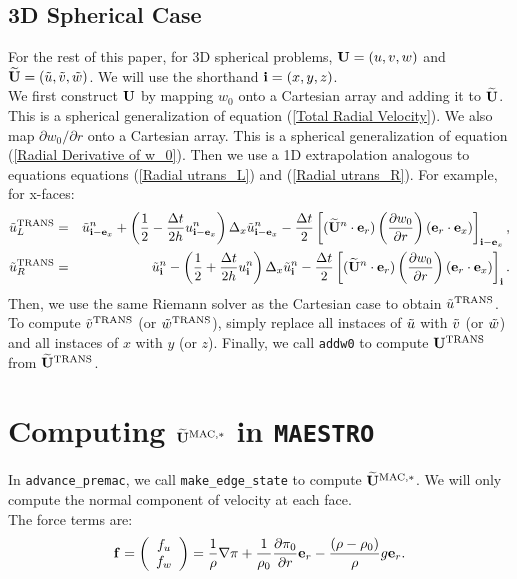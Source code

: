 \subsection{3D Spherical Case}
For the rest of this paper, for 3D spherical problems, ${\bf U} = (u,v,w)$
and $\widetilde{{\bf U}} = (\tilde{u},\tilde{v},\tilde{w})$.  We will use the shorthand ${\bf i} =
(x,y,z)$.\\

We first construct ${\bf U}$ by mapping $w_0$ onto a Cartesian array and
adding it to $\widetilde{{\bf U}}$.  This is a spherical generalization of equation
(\ref{Total Radial Velocity}).  We also map $\partial w_0/\partial r$
onto a Cartesian array.  This is a spherical generalization of
equation (\ref{Radial Derivative of w_0}).  Then we use a 1D
extrapolation analogous to equations equations (\ref{Radial utrans_L})
and (\ref{Radial utrans_R}).  For example, for x-faces:
\begin{eqnarray}
\tilde{u}_L^{\rm TRANS} &=& \tilde{u}_{{\bf i}-{\bf e}_x}^n + \left(\frac{1}{2} - \frac{\Delta t}{2h}u_{{\bf i}-{\bf e}_x}^n\right)\Delta_x\tilde{u}_{{\bf i}-{\bf e}_x}^n - \frac{\Delta t}{2}\left[(\widetilde{{\bf U}}^n\cdot{\bf e}_r)\left(\frac{\partial w_0}{\partial r}\right)({\bf e}_r\cdot{\bf e}_x)\right]_{{\bf i}-{\bf e}_x}, \\
\tilde{u}_R^{\rm TRANS} &=& \tilde{u}_{{\bf i}}^n - \left(\frac{1}{2} + \frac{\Delta t}{2h}u_{{\bf i}}^n\right)\Delta_x\tilde{u}_{{\bf i}}^n - \frac{\Delta t}{2}\left[(\widetilde{{\bf U}}^n\cdot{\bf e}_r)\left(\frac{\partial w_0}{\partial r}\right)({\bf e}_r\cdot{\bf e}_x)\right]_{{\bf i}}.
\end{eqnarray}
Then, we use the same Riemann solver as the Cartesian case to obtain
$\tilde{u}^{\rm TRANS}$.  To compute $\tilde{v}^{\rm TRANS}$ (or $\tilde{w}^{\rm TRANS}$), simply
replace all instaces of $\tilde{u}$ with $\tilde{v}$ (or $\tilde{w}$) and all instaces
of $x$ with $y$ (or $z$).  Finally, we call {\tt addw0} to compute
${\bf U}^{\rm TRANS}$ from $\widetilde{{\bf U}}^{\rm TRANS}$.

\cleardoublepage

\section{Computing $\widetilde{{\bf U}}^{\rm MAC,*}$ in {\tt MAESTRO}}
In {\tt advance\_premac}, we call {\tt make\_edge\_state} to compute
$\widetilde{{\bf U}}^{\rm MAC,*}$.  We will only compute the normal component of
velocity at each face.\\

The force terms are:
\begin{equation}
{\bf f} =
\left(\begin{array}{c}
f_u \\
f_w \\
\end{array}\right)
= \frac{1}{\rho}\nabla\pi + \frac{1}{\rho_0}\frac{\partial\pi_0}{\partial r}{\bf e}_r - \frac{(\rho-\rho_0)}{\rho}g{\bf e}_r.\label{Force Term}
\end{equation}

